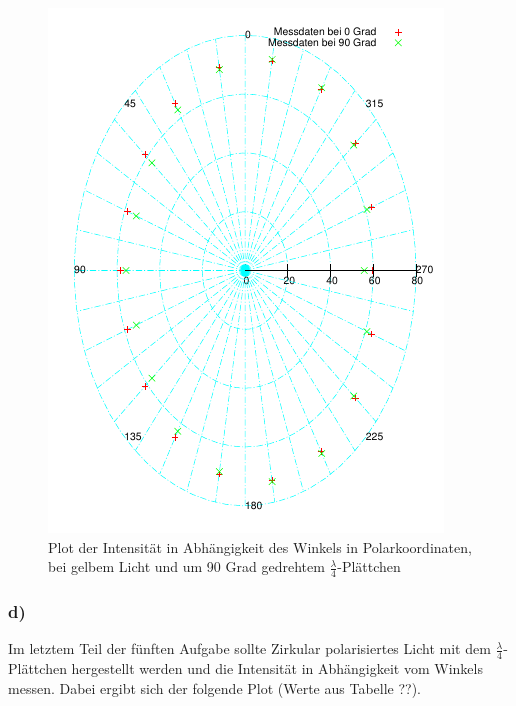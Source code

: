 \documentclass[12pt]{scrartcl}
\begin{document}
\begin{figure}[H]
\centering
    \includegraphics[scale = 1]{a_5_c_2.pdf}
  	\caption[Plot der Intensität in Abhängigkeit des Winkels in Polarkoordinaten, bei gelbem Licht und um 90 Grad gedrehtem $\frac{\lambda}{4}$-Plättchen]{Plot der Intensität in Abhängigkeit des Winkels in Polarkoordinaten, bei gelbem Licht und um 90 Grad gedrehtem $\frac{\lambda}{4}$-Plättchen}
  \label{fig:a_5_c_2}
\end{figure}


\subsubsection{d)}
Im letztem Teil der fünften Aufgabe sollte Zirkular polarisiertes Licht mit dem $\frac{\lambda}{4}$-Plättchen hergestellt werden und die Intensität in Abhängigkeit vom Winkels messen. Dabei ergibt sich der folgende Plot (Werte aus Tabelle ??).
\end{document}
